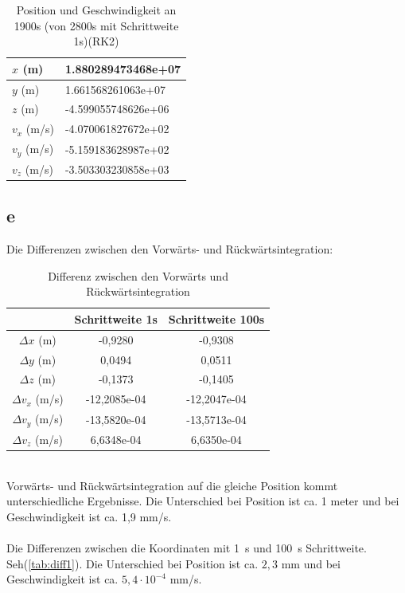 \begin{table}[htbp]\centering
	\begin{tabular}{|l|l|}
		\hline
		$x$ (m)     & 1.880289473468e+07  \\ \hline
		$y$ (m)     & 1.661568261063e+07  \\ \hline
		$z$ (m)     & -4.599055748626e+06 \\ \hline
		$v_x$ (m/s) & -4.070061827672e+02 \\ \hline
		$v_y$ (m/s) & -5.159183628987e+02 \\ \hline
		$v_z$ (m/s) & -3.503303230858e+03 \\ \hline
	\end{tabular}
	\caption{Position und Geschwindigkeit an 1900s (von 2800s mit Schrittweite 1s)(RK2)}
\end{table}
\subsection{e}
Die Differenzen zwischen den Vorwärts- und Rückwärtsintegration:
\begin{table}[htbp]\centering
	\begin{tabular}{|c|c|c|}
		\hline
						   & Schrittweite 1s & Schrittweite 100s \\ \hline
		$\Delta x$ (m)     & -0,9280 & -0,9308 \\ \hline
		$\Delta y$ (m)     & 0,0494  & 0,0511  \\ \hline
		$\Delta z$ (m)     & -0,1373 & -0,1405 \\ \hline
		$\Delta v_x$ (m/s) & -12,2085e-04 & -12,2047e-04 \\ \hline
		$\Delta v_y$ (m/s) & -13,5820e-04 & -13,5713e-04 \\ \hline
		$\Delta v_z$ (m/s) & 6,6348e-04 & 6,6350e-04 \\ \hline
	\end{tabular}
	\caption{Differenz zwischen den Vorwärts und Rückwärtsintegration}
\end{table}\\
Vorwärts- und Rückwärtsintegration auf die gleiche Position kommt unterschiedliche Ergebnisse. Die Unterschied bei Position ist ca. 1 meter und bei Geschwindigkeit ist ca. 1,9 mm/s. \\\\
Die Differenzen zwischen die Koordinaten mit \SI{1}{s} und \SI{100}{s} Schrittweite. Seh(\ref{tab:diff1}). Die Unterschied bei Position ist ca. $2,3$ mm und bei Geschwindigkeit ist ca. $5,4 \cdot 10^{-4}$ mm/s.\\\\
